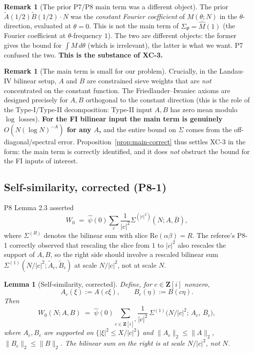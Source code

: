 \documentclass[11pt]{article}
\newtheorem{lemma}[theorem]{Lemma}
\theoremstyle{definition}
\newtheorem{remark}[theorem]{Remark}
\newcommand{\Z}{\mathbf{Z}}
\newcommand{\Zi}{\Z[i]}
\renewcommand{\Re}{\mathrm{Re}}
\begin{document}
\begin{remark}[The prior P7/P8 main term was a different object]\label{rem:prior-main}
The prior $\widetilde A(1/2)\widetilde B(1/2)\cdot N$ was the \emph{constant Fourier coefficient} of $M(\theta;N)$ in the $\theta$-direction, evaluated at $\theta=0$. This is not the main term of $\Sigma_\Psi=\widehat M(1)$ (the Fourier coefficient at $\theta$-frequency $1$). The two are different objects: the former gives the bound for $\int M\,d\theta$ (which is irrelevant), the latter is what we want. P7 confused the two. \textbf{This is the substance of XC-3.}
\end{remark}

\begin{remark}[The main term is small for our problem]\label{rem:main-small}
Crucially, in the Landau-IV bilinear setup, $A$ and $B$ are constrained sieve weights that are \emph{not} concentrated on the constant function. The Friedlander--Iwaniec axioms are designed precisely for $A,B$ orthogonal to the constant direction (this is the role of the Type-I/Type-II decomposition: Type-II input $A,B$ has zero mean modulo $\log$ losses). \textbf{For the FI bilinear input the main term is genuinely $O(N(\log N)^{-A})$ for any $A$,} and the entire bound on $\Sigma$ comes from the off-diagonal/spectral error. Proposition~\ref{prop:main-correct} thus settles XC-3 in the form: the main term is correctly identified, and it does \emph{not} obstruct the bound for the FI inputs of interest.
\end{remark}

\subsection{Self-similarity, corrected (P8-1)}\label{sec:self-sim}

P8 Lemma 2.3 asserted
\[
W_0\;=\;\widehat\psi(0)\sum_c\frac{1}{|c|^2}\Sigma^{(|c|^2)}(N;A,\overline B),
\]
where $\Sigma^{(R)}$ denotes the bilinear sum with slice $\Re(\alpha\beta)=R$. The referee's P8-1 correctly observed that rescaling the slice from $1$ to $|c|^2$ also rescales the support of $A,B$, so the right side should involve a rescaled bilinear sum $\Sigma^{(1)}(N/|c|^2;\widetilde A_c,\widetilde B_c)$ at scale $N/|c|^2$, not at scale $N$.

\begin{lemma}[Self-similarity, corrected]\label{lem:self-sim-corrected}
Define, for $c\in\Zi$ nonzero,
\[
A_c(\xi):=A(c\xi),\qquad B_c(\eta):=B(c\eta).
\]
Then
\begin{equation}\label{eq:self-sim-correct}
W_0(N;A,B)\;=\;\widehat\psi(0)\sum_{c\in\Zi^*}\frac{1}{|c|^2}\,\Sigma^{(1)}\!\bigl(N/|c|^2;\,A_c,\,\overline{B_c}\bigr),
\end{equation}
where $A_c,B_c$ are supported on $\{|\xi|^2\le X/|c|^2\}$ and $\|A_c\|_2\le\|A\|_2$, $\|B_c\|_2\le\|B\|_2$. The bilinear sum on the right is at scale $N/|c|^2$, not $N$.
\end{lemma}
\end{document}
